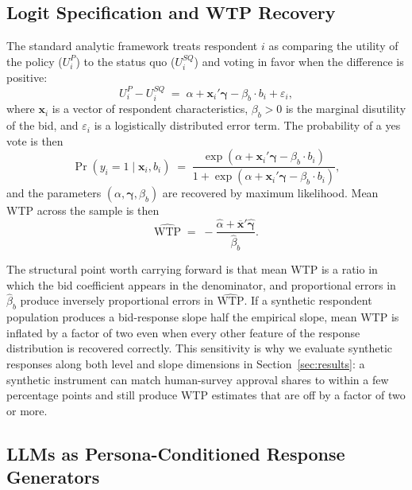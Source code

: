 \documentclass[12pt]{article}
\begin{document}
\subsection{Logit Specification and WTP Recovery}\label{sec:bg-logit}

The standard analytic framework treats respondent $i$ as comparing the
utility of the policy ($U_i^P$) to the status quo ($U_i^{SQ}$) and voting
in favor when the difference is positive:
\begin{equation}
    U_i^P - U_i^{SQ} \;=\; \alpha + \mathbf{x}_i'\boldsymbol{\gamma}
    - \beta_b \cdot b_i + \varepsilon_i,
    \label{eq:bg-utility}
\end{equation}
where $\mathbf{x}_i$ is a vector of respondent characteristics, $\beta_b > 0$
is the marginal disutility of the bid, and $\varepsilon_i$ is a
logistically distributed error term. The probability of a yes vote is then
\begin{equation}
    \Pr(y_i = 1 \mid \mathbf{x}_i, b_i) \;=\;
    \frac{\exp(\alpha + \mathbf{x}_i'\boldsymbol{\gamma} - \beta_b \cdot b_i)}{1 + \exp(\alpha + \mathbf{x}_i'\boldsymbol{\gamma} - \beta_b \cdot b_i)},
    \label{eq:bg-logit}
\end{equation}
and the parameters $(\alpha, \boldsymbol{\gamma}, \beta_b)$ are recovered by
maximum likelihood. Mean WTP across the sample is then
\begin{equation}
    \widehat{\text{WTP}} \;=\;
    -\frac{\hat{\alpha} + \overline{\mathbf{x}}'\hat{\boldsymbol{\gamma}}}{\hat{\beta}_b}.
    \label{eq:bg-wtp}
\end{equation}

The structural point worth carrying forward is that mean WTP is a ratio in
which the bid coefficient appears in the denominator, and proportional
errors in $\hat{\beta}_b$ produce inversely proportional errors in
$\widehat{\text{WTP}}$. If a synthetic respondent population produces a
bid-response slope half the empirical slope, mean WTP is inflated by a
factor of two even when every other feature of the response distribution
is recovered correctly. This sensitivity is why we evaluate synthetic
responses along both level and slope dimensions in Section~\ref{sec:results}:
a synthetic instrument can match human-survey approval shares to within
a few percentage points and still produce WTP estimates that are off by
a factor of two or more.

\subsection{LLMs as Persona-Conditioned Response Generators}\label{sec:bg-llms}
\end{document}
